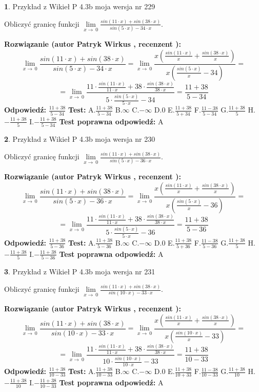 \documentclass[12pt, a4paper]{article}
\theoremstyle{definition} %
\newtheorem{zad}{}
\newcommand{\zadStart}[1]{\begin{zad}#1\newline}
\newcommand{\zadStop}{\end{zad}}
\newcommand{\rozwStart}[2]{\noindent \textbf{Rozwiązanie (autor #1 , recenzent #2): }\newline}
\newcommand{\rozwStop}{\newline}
\newcommand{\odpStart}{\noindent \textbf{Odpowiedź:}\newline}
\newcommand{\odpStop}{\newline}
\newcommand{\testStart}{\noindent \textbf{Test:}\newline}
\newcommand{\testStop}{\newline}
\newcommand{\kluczStart}{\noindent \textbf{Test poprawna odpowiedź:}\newline}
\newcommand{\kluczStop}{\newline}
\begin{document}
\zadStart{Przykład z Wikieł P 4.3b moja wersja nr 229}


Obliczyć granicę funkcji $\lim\limits_{x\to\ 0}\frac{sin(11 \cdot x)+sin(38 \cdot x)}{sin(5 \cdot x)-34 \cdot x}$.
\zadStop
\rozwStart{Patryk Wirkus}{}
$$\lim\limits_{x\to\ 0}\frac{sin(11 \cdot x)+sin(38 \cdot x)}{sin(5 \cdot x)-34 \cdot x}=\lim\limits_{x\to\ 0}\frac{x(\frac{sin(11 \cdot x)}{x}+\frac{sin(38 \cdot x)}{x})}{x(\frac{sin(5 \cdot x)}{x}-34)}=$$
$$=\lim\limits_{x\to\ 0}\frac{11 \cdot \frac{sin(11 \cdot x)}{11 \cdot x}+38 \cdot \frac{sin(38 \cdot x)}{38 \cdot x}}{5 \cdot \frac{sin(5 \cdot x)}{5 \cdot x}-34}=\frac{11+38}{5-34}$$
\rozwStop
\odpStart
$\frac{11+38}{5-34}$
\odpStop
\testStart
A.$\frac{11+38}{5-34}$
B.$\infty$
C.$-\infty$
D.$0$
E.$\frac{11+38}{5+34}$
F.$\frac{11-38}{5-34}$
G.$\frac{11+38}{5}$
H.$-\frac{11+38}{5}$
I.$-\frac{11+38}{5-34}$
\testStop
\kluczStart
A
\kluczStop



\zadStart{Przykład z Wikieł P 4.3b moja wersja nr 230}


Obliczyć granicę funkcji $\lim\limits_{x\to\ 0}\frac{sin(11 \cdot x)+sin(38 \cdot x)}{sin(5 \cdot x)-36 \cdot x}$.
\zadStop
\rozwStart{Patryk Wirkus}{}
$$\lim\limits_{x\to\ 0}\frac{sin(11 \cdot x)+sin(38 \cdot x)}{sin(5 \cdot x)-36 \cdot x}=\lim\limits_{x\to\ 0}\frac{x(\frac{sin(11 \cdot x)}{x}+\frac{sin(38 \cdot x)}{x})}{x(\frac{sin(5 \cdot x)}{x}-36)}=$$
$$=\lim\limits_{x\to\ 0}\frac{11 \cdot \frac{sin(11 \cdot x)}{11 \cdot x}+38 \cdot \frac{sin(38 \cdot x)}{38 \cdot x}}{5 \cdot \frac{sin(5 \cdot x)}{5 \cdot x}-36}=\frac{11+38}{5-36}$$
\rozwStop
\odpStart
$\frac{11+38}{5-36}$
\odpStop
\testStart
A.$\frac{11+38}{5-36}$
B.$\infty$
C.$-\infty$
D.$0$
E.$\frac{11+38}{5+36}$
F.$\frac{11-38}{5-36}$
G.$\frac{11+38}{5}$
H.$-\frac{11+38}{5}$
I.$-\frac{11+38}{5-36}$
\testStop
\kluczStart
A
\kluczStop



\zadStart{Przykład z Wikieł P 4.3b moja wersja nr 231}


Obliczyć granicę funkcji $\lim\limits_{x\to\ 0}\frac{sin(11 \cdot x)+sin(38 \cdot x)}{sin(10 \cdot x)-33 \cdot x}$.
\zadStop
\rozwStart{Patryk Wirkus}{}
$$\lim\limits_{x\to\ 0}\frac{sin(11 \cdot x)+sin(38 \cdot x)}{sin(10 \cdot x)-33 \cdot x}=\lim\limits_{x\to\ 0}\frac{x(\frac{sin(11 \cdot x)}{x}+\frac{sin(38 \cdot x)}{x})}{x(\frac{sin(10 \cdot x)}{x}-33)}=$$
$$=\lim\limits_{x\to\ 0}\frac{11 \cdot \frac{sin(11 \cdot x)}{11 \cdot x}+38 \cdot \frac{sin(38 \cdot x)}{38 \cdot x}}{10 \cdot \frac{sin(10 \cdot x)}{10 \cdot x}-33}=\frac{11+38}{10-33}$$
\rozwStop
\odpStart
$\frac{11+38}{10-33}$
\odpStop
\testStart
A.$\frac{11+38}{10-33}$
B.$\infty$
C.$-\infty$
D.$0$
E.$\frac{11+38}{10+33}$
F.$\frac{11-38}{10-33}$
G.$\frac{11+38}{10}$
H.$-\frac{11+38}{10}$
I.$-\frac{11+38}{10-33}$
\testStop
\kluczStart
A
\kluczStop
\end{document}
